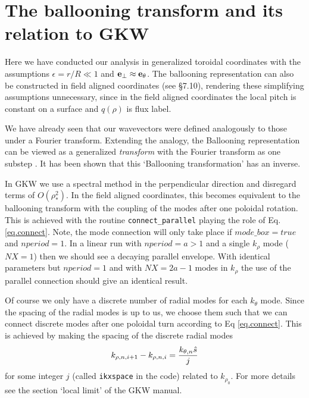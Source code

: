 \documentclass[a4paper,11pt]{article}
\begin{document}
\section{The ballooning transform and its relation to GKW}
\begin{small}


Here we have conducted our analysis in generalized toroidal coordinates with the assumptions $\epsilon = r/R \ll 1$ and ${\bf e}_\perp \approx {\bf e}_\theta$.  The ballooning representation can also be constructed in field aligned coordinates (see \cite{H+M} \S 7.10), rendering these simplifying assumptions unnecessary, since in the field aligned coordinates the local pitch is constant on a surface and $q(\rho)$ is flux label.

We have already seen that our wavevectors were defined analogously to those under a Fourier transform.  Extending the analogy, the Ballooning representation can be viewed as a generalized \textit{transform} with the Fourier transform as one substep \cite{H+M} \cite{CHT}.  It has been shown \cite{HazeltineNewcomb} that this `Ballooning transformation' has an inverse.

In GKW we use a spectral method in the perpendicular direction and disregard terms of $O(\rho_*^2)$.  In the field aligned coordinates, this becomes equivalent to the ballooning transform with the coupling of the modes after one poloidal rotation.  This is achieved with the routine \texttt{connect\_parallel} playing the role of Eq. \ref{eq.connect}. Note, the mode connection will only take place if $mode\_box=true$ and $nperiod=1$. In a linear run with $nperiod = a > 1$ and a single $k_\rho$ mode ($NX = 1$) then we should see a decaying parallel envelope. With identical parameters but $nperiod=1$ and with $NX =2a - 1$ modes in $k_\rho$ the use of the parallel connection should give an identical result.

Of course we only have a discrete number of radial modes for each $k_\theta$ mode. Since the spacing of the radial modes is up to us, we choose them such that we can connect discrete modes after one poloidal turn according to Eq \ref{eq.connect}. This is achieved by making the spacing of the discrete radial modes
\begin{equation}
k_{\rho,n,i+1}-k_{\rho,n,i}={k_{\theta,n}{\hat s}\over j}
\end{equation}
for some integer $j$ (called \texttt{ikxspace} in the code) related to $k_{\rho_0}$.  For more details see the section `local limit' of the GKW manual.


\end{small}
\end{document}
